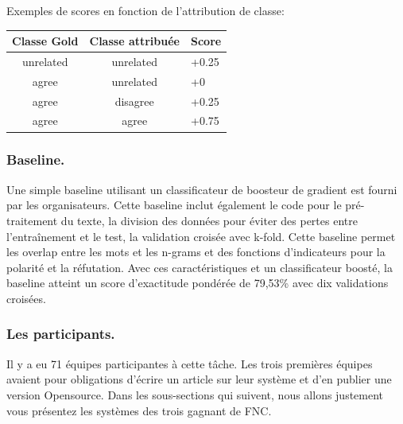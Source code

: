 \documentclass[11pt,a4paper,oldfontcommands]{memoir}
\begin{document}
Exemples de scores en fonction de l'attribution de classe:

\begin{center}
 \begin{tabular}{| c | c || l | }
  \hline
  \textbf{Classe Gold} & \textbf{Classe attribuée} & \textbf{Score} \\
  \hline
  unrelated            & unrelated                 & +0.25          \\
  agree                & unrelated                 & +0             \\
  agree                & disagree                  & +0.25          \\
  agree                & agree                     & +0.75          \\
  \hline
 \end{tabular}
\end{center}

\subsubsection{Baseline.}
Une simple baseline utilisant un classificateur de boosteur de gradient est fourni par les organisateurs.
Cette baseline inclut également le code pour le pré-traitement du texte, la division des données pour éviter des pertes entre l'entraînement et le test, la validation croisée avec k-fold.
Cette baseline permet les overlap entre les mots et les n-grams et des fonctions d'indicateurs pour la polarité et la réfutation.
Avec ces caractéristiques et un classificateur boosté, la baseline atteint un score d'exactitude pondérée de 79,53\% avec dix validations croisées.


\subsubsection{Les participants.}
Il y a eu 71 équipes participantes à cette tâche. Les trois premières équipes avaient pour obligations d'écrire un article sur leur système et d'en publier une version Opensource.
Dans les sous-sections qui suivent, nous allons justement vous présentez les systèmes des trois gagnant de FNC.

\end{document}
